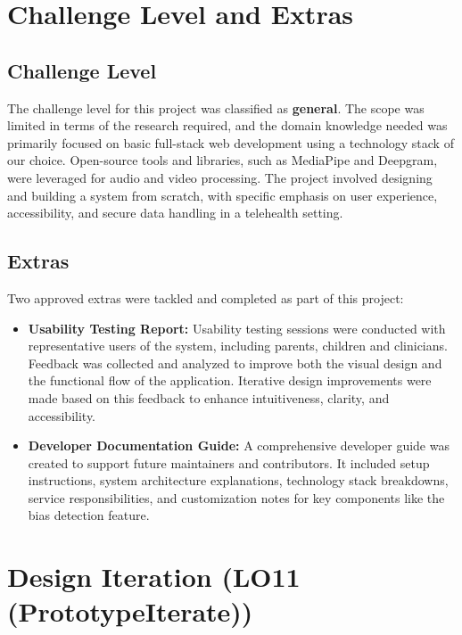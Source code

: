 \documentclass{article}
\begin{document}
\newpage

\section{Challenge Level and Extras}

\subsection{Challenge Level}

\hspace{2em}The challenge level for this project was classified as \textbf{general}. The scope was limited in terms of the research required, and the domain knowledge needed was primarily focused on basic full-stack web development using a technology stack of our choice. 
Open-source tools and libraries, such as MediaPipe and Deepgram, were leveraged for audio and video processing. The project involved designing and building a system from scratch, with specific emphasis on user experience, accessibility, and secure data handling in a telehealth setting.

\subsection{Extras}

Two approved extras were tackled and completed as part of this project:

\begin{itemize}
    \item \textbf{Usability Testing Report:} Usability testing sessions were conducted with representative users of the system, including parents, children and clinicians. 
    Feedback was collected and analyzed to improve both the visual design and the functional flow of the application. Iterative design improvements were made based on this feedback to enhance intuitiveness, clarity, and accessibility.
    
    \item \textbf{Developer Documentation Guide:} A comprehensive developer guide was created to support future maintainers and contributors. 
    It included setup instructions, system architecture explanations, technology stack breakdowns, service responsibilities, and customization notes for key components like the bias detection feature.
\end{itemize}

\newpage

\section{Design Iteration (LO11 (PrototypeIterate))}
\end{document}

